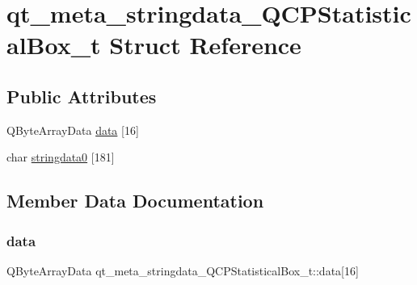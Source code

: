 \hypertarget{structqt__meta__stringdata___q_c_p_statistical_box__t}{}\section{qt\+\_\+meta\+\_\+stringdata\+\_\+\+Q\+C\+P\+Statistical\+Box\+\_\+t Struct Reference}
\label{structqt__meta__stringdata___q_c_p_statistical_box__t}
\subsection*{Public Attributes}
\begin{DoxyCompactItemize}
\item 
Q\+Byte\+Array\+Data \mbox{\hyperlink{structqt__meta__stringdata___q_c_p_statistical_box__t_af24ca573f69a923fddf1867b543c901e}{data}} \mbox{[}16\mbox{]}
\item 
char \mbox{\hyperlink{structqt__meta__stringdata___q_c_p_statistical_box__t_ab7d17ab13d29e26b4ae012fc1f795ede}{stringdata0}} \mbox{[}181\mbox{]}
\end{DoxyCompactItemize}


\subsection{Member Data Documentation}
\mbox{\label{structqt__meta__stringdata___q_c_p_statistical_box__t_af24ca573f69a923fddf1867b543c901e}} 
\subsubsection{\texorpdfstring{data}{data}}
{\footnotesize\ttfamily Q\+Byte\+Array\+Data qt\+\_\+meta\+\_\+stringdata\+\_\+\+Q\+C\+P\+Statistical\+Box\+\_\+t\+::data\mbox{[}16\mbox{]}}

\mbox{\label{structqt__meta__stringdata___q_c_p_statistical_box__t_ab7d17ab13d29e26b4ae012fc1f795ede}} 

